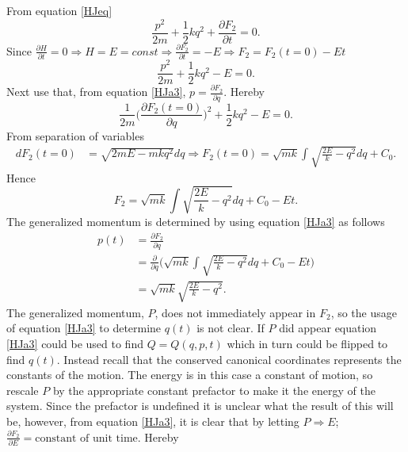 \begin{example}
	From equation \eqref{HJeq}
	\begin{equation}
		\frac{p^2}{2m}+\frac{1}{2}kq^2+\frac{\partial F_2}{\partial t}=0.
	\end{equation} 
	Since $\frac{\partial H}{\partial t}=0\Rightarrow H=E=const\Rightarrow \frac{\partial F_2}{\partial t}=-E\Rightarrow F_2=F_2(t=0)-Et$
	\begin{equation}
		\frac{p^2}{2m}+\frac{1}{2}kq^2-E=0.
	\end{equation} 
	Next use that, from equation \eqref{HJa3}, $p=\frac{\partial F_2}{\partial q}$. Hereby
	\begin{equation}
		\frac{1}{2m}\bigg(\frac{\partial F_2(t=0)}{\partial q}\bigg)^2+\frac{1}{2}kq^2-E=0.
	\end{equation} 
	From separation of variables
	\begin{equation}
		\begin{split}
			dF_2(t=0)&=\sqrt{2mE-mkq^2}dq\Rightarrow F_2(t=0)=\sqrt{mk}\int\sqrt{\frac{2E}{k}-q^2}dq+C_0.
		\end{split}
	\end{equation} 
	Hence
	\begin{equation}
		F_2=\sqrt{mk}\int\sqrt{\frac{2E}{k}-q^2}dq+C_0-Et.
	\end{equation} 
	The generalized momentum is determined by using equation \eqref{HJa3} as follows
	\begin{equation}
		\begin{split}
			p(t)&=\frac{\partial F_2}{\partial q}\\
			&=\frac{\partial }{\partial q}\bigg(\sqrt{mk}\int\sqrt{\frac{2E}{k}-q^2}dq+C_0-Et\bigg)\\
			&=\sqrt{mk}\sqrt{\frac{2E}{k}-q^2}.
		\end{split}
	\end{equation} 
	The generalized momentum, $P$, does not immediately appear in $F_2$, so the usage of equation \eqref{HJa3} to determine $q(t)$ is not clear. If $P$ did appear equation \eqref{HJa3} could be used to find $Q=Q(q,p,t)$ which in turn could be flipped to find $q(t)$. Instead recall that the conserved canonical coordinates represents the constants of the motion. The energy is in this case a constant of motion, so rescale $P$ by the appropriate constant prefactor to make it the energy of the system. Since the prefactor is undefined it is unclear what the result of this will be, however, from equation \eqref{HJa3}, it is clear that by letting $P\Rightarrow E$; $\frac{\partial F_2}{\partial E}=\text{constant of unit time}$. Hereby

\end{example}
